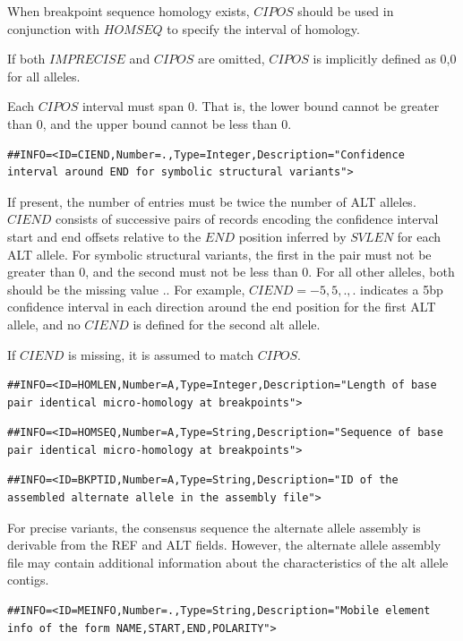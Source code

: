\documentclass[8pt]{article}
\begin{document}
When breakpoint sequence homology exists, $CIPOS$ should be used in conjunction with $HOMSEQ$ to specify the interval of homology.

If both $IMPRECISE$ and $CIPOS$ are omitted, $CIPOS$ is implicitly defined as 0,0 for all alleles.

Each $CIPOS$ interval must span 0. That is, the lower bound cannot be greater than 0, and the upper bound cannot be less than 0.

\footnotesize
\begin{verbatim}
##INFO=<ID=CIEND,Number=.,Type=Integer,Description="Confidence interval around END for symbolic structural variants">
\end{verbatim}
\normalsize

If present, the number of entries must be twice the number of ALT alleles.
$CIEND$ consists of successive pairs of records encoding the confidence interval start and end offsets relative to the $END$ position inferred by $SVLEN$ for each ALT allele.
For symbolic structural variants, the first in the pair must not be greater than 0, and the second must not be less than 0.
For all other alleles, both should be the missing value $.$.
For example, $CIEND=-5,5,.,.$ indicates a 5bp confidence interval in each direction around the end position for the first ALT allele, and no $CIEND$ is defined for the second alt allele.

If $CIEND$ is missing, it is assumed to match $CIPOS$.

\footnotesize
\begin{verbatim}
##INFO=<ID=HOMLEN,Number=A,Type=Integer,Description="Length of base pair identical micro-homology at breakpoints">
\end{verbatim}
\normalsize
\footnotesize
\begin{verbatim}
##INFO=<ID=HOMSEQ,Number=A,Type=String,Description="Sequence of base pair identical micro-homology at breakpoints">
\end{verbatim}
\normalsize
\footnotesize
\begin{verbatim}
##INFO=<ID=BKPTID,Number=A,Type=String,Description="ID of the assembled alternate allele in the assembly file">
\end{verbatim}
\normalsize
For precise variants, the consensus sequence the alternate allele assembly is derivable from the REF and ALT fields.
However, the alternate allele assembly file may contain additional information about the characteristics of the alt allele contigs.

\footnotesize
\begin{verbatim}
##INFO=<ID=MEINFO,Number=.,Type=String,Description="Mobile element info of the form NAME,START,END,POLARITY">
\end{verbatim}
\normalsize
\end{document}
